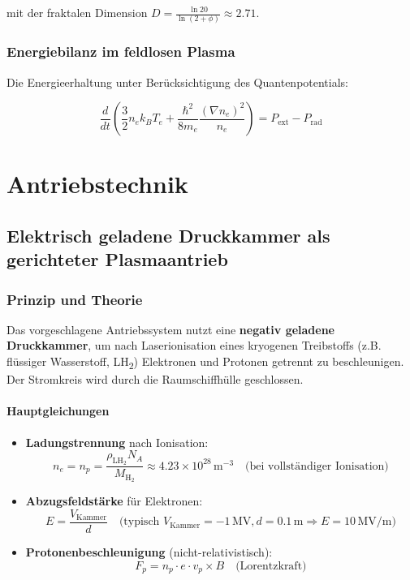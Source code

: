 mit der fraktalen Dimension $D = \frac{\ln 20}{\ln(2+\phi)} \approx 2.71$.

\subsection{Energiebilanz im feldlosen Plasma}

Die Energieerhaltung unter Berücksichtigung des Quantenpotentials:

\begin{equation}
\label{eq:energy}
\frac{d}{dt}\left(\frac{3}{2}n_e k_B T_e + \frac{\hbar^2}{8m_e} \frac{(\nabla n_e)^2}{n_e}\right) = P_{\text{ext}} - P_{\text{rad}}
\end{equation}

\chapter{Antriebstechnik}
\section{Elektrisch geladene Druckkammer als gerichteter Plasmaantrieb}
\label{sec:plasma-antrieb}

\subsection{Prinzip und Theorie}
Das vorgeschlagene Antriebssystem nutzt eine \textbf{negativ geladene Druckkammer}, um nach Laserionisation eines kryogenen Treibstoffs (z.B. flüssiger Wasserstoff, LH\textsubscript{2}) Elektronen und Protonen getrennt zu beschleunigen. Der Stromkreis wird durch die Raumschiffhülle geschlossen.

\subsubsection*{Hauptgleichungen}
\begin{itemize}
    \item \textbf{Ladungstrennung} nach Ionisation:
        \begin{equation}
            n_e = n_p = \frac{\rho_{\text{LH}_2} N_A}{M_{\text{H}_2}} \approx 4.23 \times 10^{28}\,\text{m}^{-3} \quad \text{(bei vollständiger Ionisation)}
            \label{eq:dichte}
        \end{equation}
    
    \item \textbf{Abzugsfeldstärke} für Elektronen:
        \begin{equation}
            E = \frac{V_{\text{Kammer}}}{d} \quad \text{(typisch } V_{\text{Kammer}} = -1\,\text{MV}, d = 0.1\,\text{m} \Rightarrow E = 10\,\text{MV/m})
            \label{eq:feld}
        \end{equation}
    
    \item \textbf{Protonenbeschleunigung} (nicht-relativistisch):
        \begin{equation}
            F_p = n_p \cdot e \cdot v_p \times B \quad \text{(Lorentzkraft)}
            \label{eq:lorentz_2}
        \end{equation}
\end{itemize}

